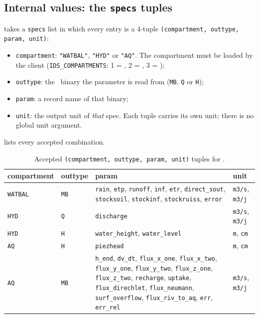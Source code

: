 \subsection{Internal values: the \texttt{specs} tuples}
 takes a \texttt{specs} list in which every entry is a 4-tuple \texttt{(compartment, outtype, param, unit)}:
\begin{itemize}
    \item \texttt{compartment}: \texttt{"WATBAL"}, \texttt{"HYD"} or \texttt{"AQ"}. The compartment must be loaded by the client (\texttt{IDS\_COMPARTMENTS}: 1 = , 2 = , 3 = );
    \item \texttt{outtype}: the \cawaqs~binary the parameter is read from (\texttt{MB}, \texttt{Q} or \texttt{H});
    \item \texttt{param}: a record name of that binary;
    \item \texttt{unit}: the output unit of \emph{that} spec. Each tuple carries its own unit; there is no global unit argument.
\end{itemize}
 lists every accepted combination.

\begin{table}[H]
    \centering
    \footnotesize
    \begin{tabular}{>{\raggedright}p{1.7cm}>{\raggedright}p{1.3cm}>{\raggedright}p{7.6cm}>{\raggedright\arraybackslash}p{2.6cm}}
        \hline
        \textbf{compartment} & \textbf{outtype} & \textbf{param} & \textbf{unit} \\
        \hline
        \texttt{WATBAL} & \texttt{MB} & \texttt{rain}, \texttt{etp}, \texttt{runoff}, \texttt{inf}, \texttt{etr}, \texttt{direct\_sout}, \texttt{stocksoil}, \texttt{stockinf}, \texttt{stockruiss}, \texttt{error} & \texttt{m3/s}, \texttt{m3/j} \\
        \texttt{HYD} & \texttt{Q} & \texttt{discharge} & \texttt{m3/s}, \texttt{m3/j} \\
        \texttt{HYD} & \texttt{H} & \texttt{water\_height}, \texttt{water\_level} & \texttt{m}, \texttt{cm} \\
        \texttt{AQ} & \texttt{H} & \texttt{piezhead} & \texttt{m}, \texttt{cm} \\
        \texttt{AQ} & \texttt{MB} & \texttt{h\_end}, \texttt{dv\_dt}, \texttt{flux\_x\_one}, \texttt{flux\_x\_two}, \texttt{flux\_y\_one}, \texttt{flux\_y\_two}, \texttt{flux\_z\_one}, \texttt{flux\_z\_two}, \texttt{recharge}, \texttt{uptake}, \texttt{flux\_direchlet}, \texttt{flux\_neumann}, \texttt{surf\_overflow}, \texttt{flux\_riv\_to\_aq}, \texttt{err}, \texttt{err\_rel} & \texttt{m3/s}, \texttt{m3/j} \\
        \hline
    \end{tabular}
    \caption{Accepted \texttt{(compartment, outtype, param, unit)} tuples for .}
    \label{tab-extract-specs}
\end{table}

